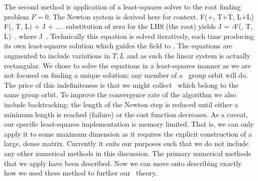 The second method is application of a least-squares solver 
to the root finding problem $F=0$. The Newton system is
derived here for context.
\beq
F(\Fu+\delta\Fu, T+\delta T, L+\delta L)\approx
F(\Fu, T, L) + J  + \dots \,.
\eeq
substitution of zero for the LHS (the root) yields
\beq \label{newton}
J  = -F(\Fu, T, L) \,.
\eeq
where
\beq
J \equiv {} \,.
\eeq
Technically this equation is solved iteratively, each time producing its own least-squares solution which guides the field to \twot. The equations are augmented to include variations in $T,L$ and as
such the linear system is actually rectangular.
We chose to solve the equations in a least-squares manner as we are not focused on finding a unique
solution; any member of a \twots\ group orbit will do. The price of this indefiniteness is that we might
collect \twots\ which belong to the same group orbit. To improve the convergence rate of the algorithm we also include backtracking: the length of the Newton step is reduced until either a minimum length is reached (failure) or the cost function decreases. 
As a caveat, our specific least-squares
implementation is memory limited. That is, we can only apply it to some maximum dimension as it requires
the explicit construction of a large, dense matrix. Currently it suits our purposes such that we do not include any other numerical methods in this discussion.
The primary numerical methods that we apply have been described. 
Now we can move onto describing exactly
how we used these method to further our \spt\ theory.
 
